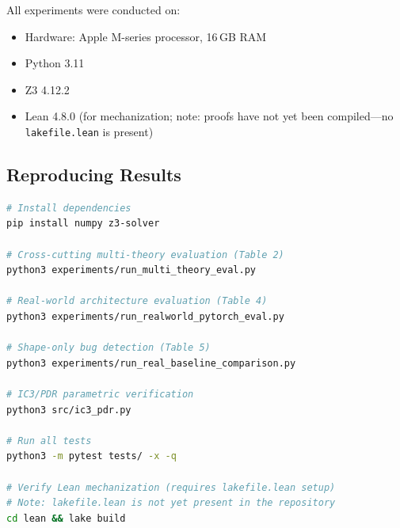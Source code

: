 \documentclass[10pt]{article}
\theoremstyle{plain}
\theoremstyle{definition}
\theoremstyle{remark}
\begin{document}
All experiments were conducted on:
\begin{itemize}[nosep]
  \item Hardware: Apple M-series processor, 16\,GB RAM
  \item Python 3.11
  \item Z3 4.12.2
  \item Lean 4.8.0 (for mechanization; note: proofs have not yet
    been compiled---no \texttt{lakefile.lean} is present)
\end{itemize}

\subsection{Reproducing Results}

\begin{lstlisting}[style=noline,language=bash,
  caption={Commands to reproduce all experimental results.}]
# Install dependencies
pip install numpy z3-solver

# Cross-cutting multi-theory evaluation (Table 2)
python3 experiments/run_multi_theory_eval.py

# Real-world architecture evaluation (Table 4)
python3 experiments/run_realworld_pytorch_eval.py

# Shape-only bug detection (Table 5)
python3 experiments/run_real_baseline_comparison.py

# IC3/PDR parametric verification
python3 src/ic3_pdr.py

# Run all tests
python3 -m pytest tests/ -x -q

# Verify Lean mechanization (requires lakefile.lean setup)
# Note: lakefile.lean is not yet present in the repository
cd lean && lake build
\end{lstlisting}
\end{document}
